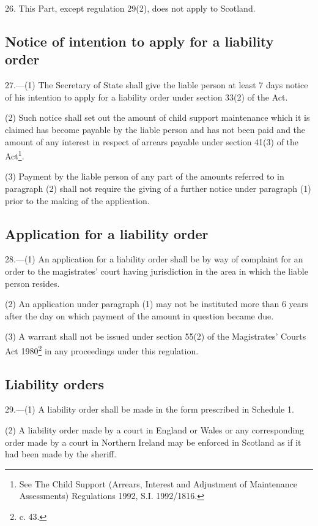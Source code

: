 \documentclass[a4paper]{article}
\begin{document}
26.  This Part, except regulation 29(2), does not apply to Scotland.

\subsection[27. Notice of intention to apply for a liability order]{Notice of intention to apply for a liability order}

27.—(1) The Secretary of State shall give the liable person at least 7 days notice of his intention to apply for a liability order under section 33(2) of the Act.

(2) Such notice shall set out the amount of child support maintenance which it is claimed has become payable by the liable person and has not been paid and the amount of any interest in respect of arrears payable under section 41(3) of the Act\footnote{\frenchspacing See The Child Support (Arrears, Interest and Adjustment of Maintenance Assessments) Regulations 1992, S.I. 1992/1816.}.

(3) Payment by the liable person of any part of the amounts referred to in paragraph (2) shall not require the giving of a further notice under paragraph (1) prior to the making of the application.

\subsection[28. Application for a liability order]{Application for a liability order}

28.—(1) An application for a liability order shall be by way of complaint for an order to the magistrates' court having jurisdiction in the area in which the liable person resides.

(2) An application under paragraph (1) may not be instituted more than 6 years after the day on which payment of the amount in question became due.

(3) A warrant shall not be issued under section 55(2) of the Magistrates' Courts Act 1980\footnote{ c. 43.} in any proceedings under this regulation.

\subsection[29. Liability orders]{Liability orders}

29.—(1) A liability order shall be made in the form prescribed in Schedule 1.

(2) A liability order made by a court in England or Wales or any corresponding order made by a court in Northern Ireland may be enforced in Scotland as if it had been made by the sheriff.
\end{document}
